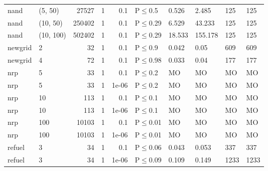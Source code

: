 \begin{longtable}{llrrrlllll}
 nand          & (5, 50)   &  	27527 & 1 & 0.1   & P$\leq$0.5   & 0.526  & 2.485   & 125    & 125    \\
 nand          & (10, 50)  & 	250402 & 1 & 0.1   & P$\leq$0.29  & 6.529  & 43.233  & 125    & 125    \\
 nand          & (10, 100) & 	502402 & 1 & 0.1   & P$\leq$0.29  & 18.533 & 155.178 & 125    & 125    \\
 newgrid       & 2         &     	32 & 1 & 0.1   & P$\leq$0.9   & 0.042  & 0.05    & 609    & 609    \\
 newgrid       & 4         &     	72 & 1 & 0.1   & P$\leq$0.98  & 0.033  & 0.04    & 177    & 177    \\
 nrp           & 5         &     	33 & 1 & 0.1   & P$\leq$0.2   & MO     & MO      & MO     & MO     \\
 nrp           & 5         &     	33 & 1 & 1e-06 & P$\leq$0.2   & MO     & MO      & MO     & MO     \\
 nrp           & 10        &    	113 & 1 & 0.1   & P$\leq$0.1   & MO     & MO      & MO     & MO     \\
 nrp           & 10        &    	113 & 1 & 1e-06 & P$\leq$0.1   & MO     & MO      & MO     & MO     \\
 nrp           & 100       &  	10103 & 1 & 0.1   & P$\leq$0.01  & MO     & MO      & MO     & MO     \\
 nrp           & 100       &  	10103 & 1 & 1e-06 & P$\leq$0.01  & MO     & MO      & MO     & MO     \\
 refuel        & 3         &     	34 & 1 & 0.1   & P$\leq$0.06  & 0.043  & 0.053   & 337    & 337    \\
 refuel        & 3         &     	34 & 1 & 1e-06 & P$\leq$0.09  & 0.109  & 0.149   & 1233   & 1233   \\
\bottomrule
\end{longtable}
